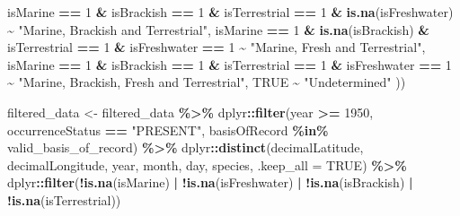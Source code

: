 \documentclass[
]{article}
\newenvironment{Shaded}{\begin{snugshade}}{\end{snugshade}}
\newcommand{\AttributeTok}[1]{\textcolor[rgb]{0.13,0.29,0.53}{#1}}
\newcommand{\ConstantTok}[1]{\textcolor[rgb]{0.56,0.35,0.01}{#1}}
\newcommand{\DecValTok}[1]{\textcolor[rgb]{0.00,0.00,0.81}{#1}}
\newcommand{\FunctionTok}[1]{\textcolor[rgb]{0.13,0.29,0.53}{\textbf{#1}}}
\newcommand{\NormalTok}[1]{#1}
\newcommand{\OtherTok}[1]{\textcolor[rgb]{0.56,0.35,0.01}{#1}}
\newcommand{\SpecialCharTok}[1]{\textcolor[rgb]{0.81,0.36,0.00}{\textbf{#1}}}
\newcommand{\StringTok}[1]{\textcolor[rgb]{0.31,0.60,0.02}{#1}}
\begin{document}
\begin{Shaded}
\begin{Highlighting}[]
\NormalTok{    isMarine }\SpecialCharTok{==} \DecValTok{1} \SpecialCharTok{\&}\NormalTok{ isBrackish }\SpecialCharTok{==} \DecValTok{1} \SpecialCharTok{\&}\NormalTok{ isTerrestrial }\SpecialCharTok{==} \DecValTok{1} \SpecialCharTok{\&} \FunctionTok{is.na}\NormalTok{(isFreshwater) }\SpecialCharTok{\textasciitilde{}} \StringTok{"Marine, Brackish and Terrestrial"}\NormalTok{,}
\NormalTok{    isMarine }\SpecialCharTok{==} \DecValTok{1} \SpecialCharTok{\&} \FunctionTok{is.na}\NormalTok{(isBrackish) }\SpecialCharTok{\&}\NormalTok{ isTerrestrial }\SpecialCharTok{==} \DecValTok{1} \SpecialCharTok{\&}\NormalTok{ isFreshwater }\SpecialCharTok{==} \DecValTok{1} \SpecialCharTok{\textasciitilde{}} \StringTok{"Marine, Fresh and Terrestrial"}\NormalTok{,}
\NormalTok{    isMarine }\SpecialCharTok{==} \DecValTok{1} \SpecialCharTok{\&}\NormalTok{ isBrackish }\SpecialCharTok{==} \DecValTok{1} \SpecialCharTok{\&}\NormalTok{ isTerrestrial }\SpecialCharTok{==} \DecValTok{1} \SpecialCharTok{\&}\NormalTok{ isFreshwater }\SpecialCharTok{==} \DecValTok{1} \SpecialCharTok{\textasciitilde{}} \StringTok{"Marine, Brackish, Fresh and Terrestrial"}\NormalTok{, }\ConstantTok{TRUE} \SpecialCharTok{\textasciitilde{}} \StringTok{"Undetermined"}
\NormalTok{  ))}

\NormalTok{filtered\_data }\OtherTok{\textless{}{-}}\NormalTok{ filtered\_data }\SpecialCharTok{\%\textgreater{}\%}
\NormalTok{  dplyr}\SpecialCharTok{::}\FunctionTok{filter}\NormalTok{(year }\SpecialCharTok{\textgreater{}=} \DecValTok{1950}\NormalTok{,}
\NormalTok{    occurrenceStatus }\SpecialCharTok{==} \StringTok{"PRESENT"}\NormalTok{,}
\NormalTok{    basisOfRecord }\SpecialCharTok{\%in\%}\NormalTok{ valid\_basis\_of\_record) }\SpecialCharTok{\%\textgreater{}\%}
\NormalTok{  dplyr}\SpecialCharTok{::}\FunctionTok{distinct}\NormalTok{(decimalLatitude, decimalLongitude, year, month, day, species, }\AttributeTok{.keep\_all =} \ConstantTok{TRUE}\NormalTok{) }\SpecialCharTok{\%\textgreater{}\%}
\NormalTok{  dplyr}\SpecialCharTok{::}\FunctionTok{filter}\NormalTok{(}\SpecialCharTok{!}\FunctionTok{is.na}\NormalTok{(isMarine) }\SpecialCharTok{|} \SpecialCharTok{!}\FunctionTok{is.na}\NormalTok{(isFreshwater) }\SpecialCharTok{|} \SpecialCharTok{!}\FunctionTok{is.na}\NormalTok{(isBrackish) }\SpecialCharTok{|} \SpecialCharTok{!}\FunctionTok{is.na}\NormalTok{(isTerrestrial))}
\end{Highlighting}
\end{Shaded}
\end{document}

